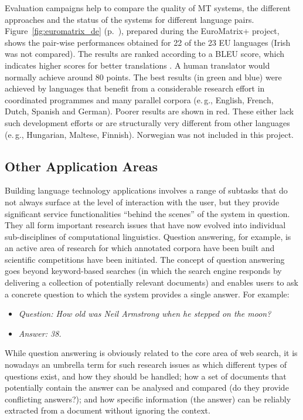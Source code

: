 \begin{multicols}{2}
Evaluation campaigns help to compare the quality of MT systems, the different approaches and the status of the systems for different language pairs.
Figure~\ref{fig:euromatrix_de} (p.~\pageref{fig:euromatrix_de}), prepared during the EuroMatrix+ project, shows the pair-wise performances obtained for 22 of the 23 EU languages (Irish was not compared). The results are ranked according to a BLEU score, which indicates higher scores for better translations \cite{bleu1}. A human translator would normally achieve around 80 points. The best results (in green and blue) were achieved by languages that benefit from a considerable research effort in coordinated programmes and many parallel corpora (e.\,g., English, French, Dutch, Spanish and German). Poorer results are shown in red. These either lack such development efforts or are structurally very different from other languages (e.\,g., Hungarian, Maltese, Finnish). Norwegian was not included in this project.

\subsection{Other Application Areas}

Building language technology applications involves a range of subtasks that do not always surface at the level of interaction with the user, but they provide significant service functionalities “behind the scenes” of the system in question. They all form important research issues that have now evolved into individual sub-disciplines of computational linguistics.  Question answering, for example, is an active area of research for which annotated corpora have been built and scientific competitions have been initiated. The concept of question answering goes beyond keyword-based searches (in which the search engine responds by delivering a collection of potentially relevant documents) and enables users to ask a concrete question to which the system provides a single answer. For example:

\begin{itemize}
\item[] \textit{Question: How old was Neil Armstrong when he stepped on the moon?}
\item[] \textit{Answer: 38.}
\end{itemize}

While question answering is obviously related to the core area of web search, it is nowadays an umbrella term for such research issues as which different types of questions exist, and how they should be handled; how a set of documents that potentially contain the answer can be analysed and compared (do they provide conflicting answers?); and how specific information (the answer) can be reliably extracted from a document without ignoring the context. 


\end{multicols}
